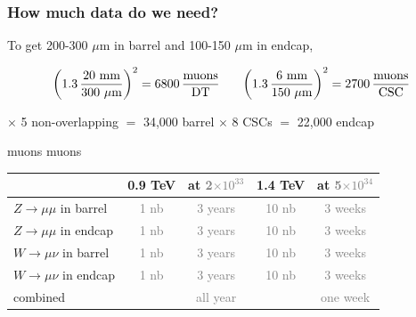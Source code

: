 \documentclass[compress]{beamer}
\begin{document}
\begin{frame}
\frametitle{How much data do we need?}

To get 200-300 $\mu$m in barrel and 100-150 $\mu$m in endcap,

\[ \left(1.3 \, \frac{\mbox{20 mm}}{\mbox{300 $\mu$m}}\right)^2 = \mbox{6800}\,\frac{\mbox{muons}}{\mbox{DT}} \mbox{\hspace{0.6 cm}} \left(1.3 \, \frac{\mbox{6 mm}}{\mbox{150 $\mu$m}}\right)^2 = \mbox{2700}\,\frac{\mbox{muons}}{\mbox{CSC}} \]

$\times$ 5 {\small non-overlapping} $=$ 34,000 barrel \mbox{\hspace{0.5 cm}} $\times$ 8 CSCs $=$ 22,000 endcap

\vspace{-0.05 cm}
\hspace{4.5 cm} muons \hspace{3.8 cm} muons


\begin{center}
\begin{tabular}{l c c c c}
& 0.9 TeV & at \textcolor{gray}{2$\times 10^{33}$} & 1.4 TeV & at \textcolor{gray}{5$\times 10^{34}$} \\ \hline
$Z \to \mu\mu$ in barrel & \textcolor{gray}{1 nb} & \textcolor{gray}{3 years} & \textcolor{gray}{10 nb} & \textcolor{gray}{3 weeks} \\
$Z \to \mu\mu$ in endcap & \textcolor{gray}{1 nb} & \textcolor{gray}{3 years} & \textcolor{gray}{10 nb} & \textcolor{gray}{3 weeks} \\
$W \to \mu\nu$ in barrel & \textcolor{gray}{1 nb} & \textcolor{gray}{3 years} & \textcolor{gray}{10 nb} & \textcolor{gray}{3 weeks} \\
$W \to \mu\nu$ in endcap & \textcolor{gray}{1 nb} & \textcolor{gray}{3 years} & \textcolor{gray}{10 nb} & \textcolor{gray}{3 weeks} \\ \hline
combined & & \textcolor{gray}{all year} & & \textcolor{gray}{one week}
\end{tabular}
\end{center}
\end{frame}
\end{document}
